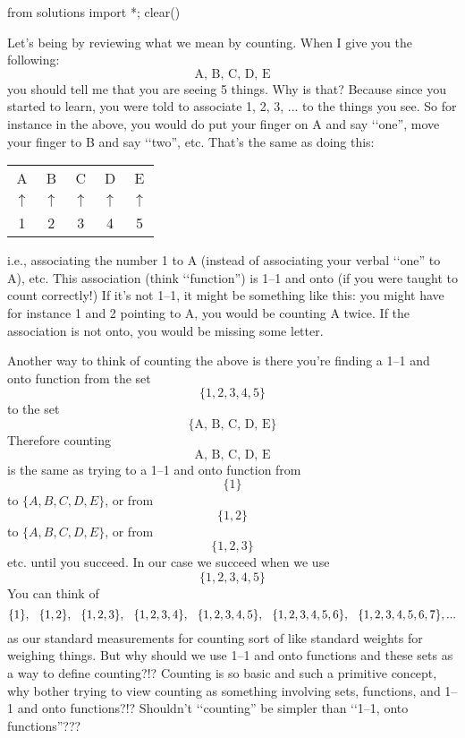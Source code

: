 \begin{python0}
from solutions import *; clear()
\end{python0}

Let's being by reviewing what we mean by counting.
When I give you the following:
\[
\text{A, B, C, D, E}
\]
you should tell me that you are seeing 5 things.
Why is that? 
Because since you started to learn, you were told to associate
1, 2, 3, ... to the things you see.
So for instance in the above, you would do put your
finger on A and say \lq\lq one'',
move your finger to B and say \lq\lq two'', etc.
That's the same as doing this:
\begin{longtable}{ccccc}
A & B & C & D & E \\
$\uparrow$ & $\uparrow$ & 
$\uparrow$ & 
$\uparrow$ & 
$\uparrow$  \\
1 & 2 & 3 & 4 & 5
\end{longtable}
i.e., associating the number 1 to A (instead of associating your
verbal \lq\lq one'' to A), etc.
This association (think \lq\lq function'') is 1--1 and onto
(if you were taught to count correctly!)
If it's not 1--1, it might be something like this:
you might have for instance 1 and 2 pointing to A,
you would be counting A twice.
If the association is not onto, you would be missing some letter.

Another way to think of counting the above is there you're finding a
1--1 and onto function from the set 
\[
\{1, 2, 3, 4, 5\}
\]
to the set
\[
\{\text{A, B, C, D, E}\}
\]
Therefore counting
\[
\text{A, B, C, D, E}
\]
is the same as trying to a 1--1 and onto function from 
\[
\{1\}
\]
to $\{A, B, C, D, E\}$, or from 
\[
\{1, 2\}
\]
to $\{A, B, C, D, E\}$, or from 
\[
\{1, 2, 3\}
\] 
etc. until you succeed.
In our case we succeed when we use 
\[
\{1, 2, 3, 4, 5\}
\]
You can think of 
\[
\{1\}, \hspace{0.25cm}
\{1,2\}, \hspace{0.25cm}
\{1,2,3\}, \hspace{0.25cm}
\{1,2,3,4\}, \hspace{0.25cm}
\{1,2,3,4,5\}, \hspace{0.25cm}
\{1,2,3,4,5,6\}, \hspace{0.25cm}
\{1,2,3,4,5,6,7\}, ... 
\]
as our standard measurements for counting
sort of like standard weights for weighing things.
But why should we use 1--1 and onto functions and these sets as
a way to define counting?!?
Counting is so basic and such a primitive concept, why
bother trying to view counting as something involving sets, functions,
and 1--1 and onto functions?!?
Shouldn't \lq\lq counting'' be simpler than \lq\lq 1--1, onto functions''???


